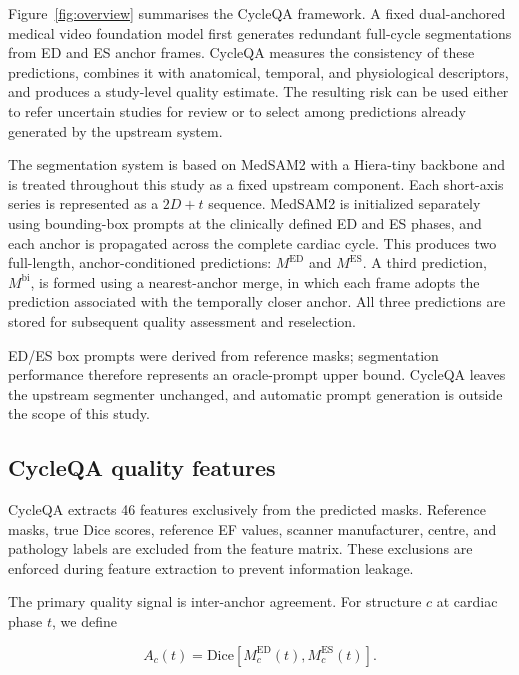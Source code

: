\documentclass[runningheads]{llncs}
\newcommand{\CQ}{CycleQA}
\begin{document}
\vspace{-1cm}


Figure~\ref{fig:overview} summarises the \CQ{} framework. A fixed dual-anchored medical video foundation model first generates redundant full-cycle segmentations from ED and ES anchor frames. \CQ{} measures the consistency of these predictions, combines it with anatomical, temporal, and physiological descriptors, and produces a study-level quality estimate. The resulting risk can be used either to refer uncertain studies for review or to select among predictions already generated by the upstream system.

The segmentation system is based on MedSAM2 with a Hiera-tiny backbone and is treated throughout this study as a fixed upstream component. Each short-axis series is represented as a $2D+t$ sequence. MedSAM2 is initialized separately using bounding-box prompts at the clinically defined ED and ES phases, and each anchor is propagated across the complete cardiac cycle. This produces two full-length, anchor-conditioned predictions: $M^{\mathrm{ED}}$ and $M^{\mathrm{ES}}$. A third prediction, $M^{\mathrm{bi}}$, is formed using a nearest-anchor merge, in which each frame adopts the prediction associated with the temporally closer anchor. All three predictions are stored for subsequent quality assessment and reselection.


ED/ES box prompts were derived from reference masks; segmentation performance therefore represents an oracle-prompt upper bound. \CQ{} leaves the upstream segmenter unchanged, and automatic prompt generation is outside the scope of this study.


\subsection{\CQ{} quality features}

\CQ{} extracts 46 features exclusively from the predicted masks. Reference masks, true Dice scores, reference EF values, scanner manufacturer, centre, and pathology labels are excluded from the feature matrix. These exclusions are enforced during feature extraction to prevent information leakage.

The primary quality signal is inter-anchor agreement. For structure $c$ at cardiac phase $t$, we define

\begin{equation}
A_c(t)
=
\mathrm{Dice}\!\left[
M^{\mathrm{ED}}_c(t),
M^{\mathrm{ES}}_c(t)
\right].
\end{equation}
\end{document}
